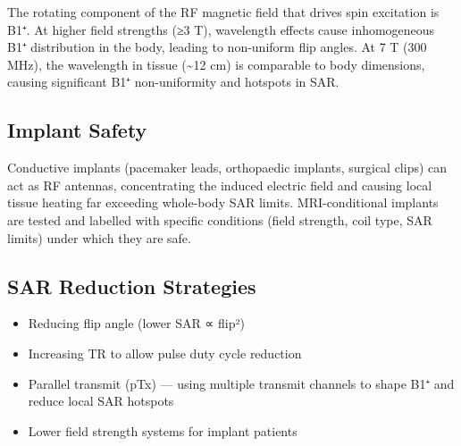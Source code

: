 				

The rotating component of the RF magnetic field that drives spin excitation is B1⁺. At higher field strengths (≥3 T), wavelength effects cause inhomogeneous B1⁺ distribution in the body, leading to non-uniform flip angles. At 7 T (300 MHz), the wavelength in tissue (\textasciitilde{}12 cm) is comparable to body dimensions, causing significant B1⁺ non-uniformity and hotspots in SAR.

				

\subsection{Implant Safety}

				

Conductive implants (pacemaker leads, orthopaedic implants, surgical clips) can act as RF antennas, concentrating the induced electric field and causing local tissue heating far exceeding whole-body SAR limits. MRI-conditional implants are tested and labelled with specific conditions (field strength, coil type, SAR limits) under which they are safe.

				

\subsection{SAR Reduction Strategies}

				
\begin{itemize}

					\item Reducing flip angle (lower SAR ∝ flip²)

					\item Increasing TR to allow pulse duty cycle reduction

					\item Parallel transmit (pTx) — using multiple transmit channels to shape B1⁺ and reduce local SAR hotspots

					\item Lower field strength systems for implant patients

				
\end{itemize}



